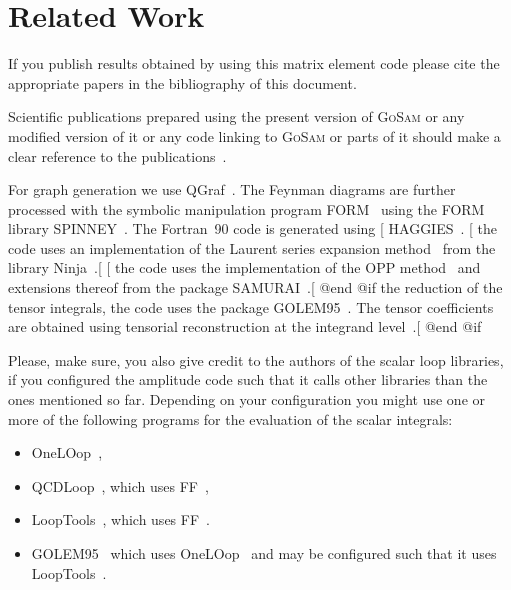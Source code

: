 {{{{{{{{{\printindex

\section{Related Work}
If you publish results obtained by using this matrix element code
please cite the appropriate papers in the bibliography of this document.

Scientific publications prepared using the present version of
\textsc{GoSam} or any modified version of it or any code linking to
\textsc{GoSam} or parts of it should make a clear
reference to the publications~\cite{Cullen:2014yla,Cullen:2011ac}.

For graph generation we use QGraf~\cite{Nogueira:1991ex}.
The Feynman diagrams are further processed with the symbolic manipulation
program FORM~\cite{Kuipers:2012rf,Vermaseren:2000nd} using the FORM library
SPINNEY~\cite{Cullen:2010jv}.
The Fortran~90 code is generated using 
[%
HAGGIES~\cite{Reiter:2009ts}.
[%
the code uses an implementation of the Laurent series expansion 
method~\cite{Mastrolia:2012bu}
from the library Ninja~\cite{Peraro:2014cba}.[%
[%
the code uses the implementation of the OPP
method~\cite{Ossola:2006us,Ossola:2007bb}
and extensions thereof from the package
SAMURAI~\cite{Mastrolia:2010nb}.[%
@end @if %
the reduction of the tensor integrals, the code uses the 
package GOLEM95~\cite{Guillet:2013msa,Binoth:2008uq,Cullen:2011kv}.
The tensor coefficients are
obtained using tensorial reconstruction at the integrand
level~\cite{Heinrich:2010ax}.[%
@end @if %

Please, make sure, you also give credit to the authors of the scalar
loop libraries, if you configured the amplitude code such that it calls
other libraries than the ones mentioned so far. Depending on your
configuration you might use one or more of the following programs for
the evaluation of the scalar integrals:
\begin{itemize}
\item OneLOop~\cite{vanHameren:2010cp},
\item QCDLoop~\cite{Ellis:2007qk}, which uses FF~\cite{vanOldenborgh:1990yc},
\item LoopTools~\cite{Hahn:1998yk}, which uses FF~\cite{vanOldenborgh:1990yc}.
\item GOLEM95~\cite{Binoth:2008uq,Guillet:2013msa} which uses OneLOop~\cite{vanHameren:2010cp}
   and may be configured such that it uses
   LoopTools~\cite{Hahn:1998yk,vanOldenborgh:1990yc}.
\end{itemize}

}}}}}}}}}
